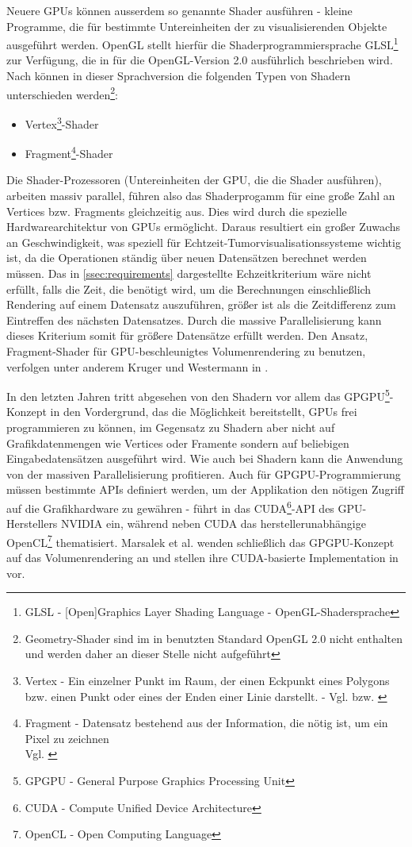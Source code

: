 \documentclass[pdftex,a4paper,titlepage,12pt]{scrartcl}
\newtheorem[L]{boxedDefinition}{Definition}
\begin{document}
\marginpar[Shader]{}\label{m:shader}Neuere GPUs können ausserdem so genannte Shader ausführen - kleine Programme, die für bestimmte Untereinheiten der zu visualisierenden Objekte ausgeführt werden. OpenGL stellt hierfür die Shaderprogrammiersprache GLSL\footnote{GLSL - [Open]Graphics Layer Shading Language - OpenGL-Shadersprache} zur Verfügung, die in \cite{Rost2006} für die OpenGL-Version 2.0 ausführlich beschrieben wird. Nach \cite[Seite 38-47]{Rost2006} können in dieser Sprachversion die folgenden Typen von Shadern unterschieden werden\footnote{Geometry-Shader sind im in \cite{Rost2006} benutzten Standard OpenGL 2.0 nicht enthalten und werden daher an dieser Stelle nicht aufgeführt}:
\begin{itemize}
 \item Vertex\footnote{Vertex - Ein einzelner Punkt im Raum, der einen Eckpunkt eines Polygons bzw. einen Punkt oder eines der Enden einer Linie darstellt. - Vgl. \cite[Seite 664]{Wright2000} bzw. \cite[Seite 685]{Rost2006}}-Shader
 \item Fragment\footnote{Fragment - Datensatz bestehend aus der Information, die nötig ist, um ein Pixel zu zeichnen\\Vgl. \cite[Seite 675]{Rost2006}}-Shader
\end{itemize}
Die Shader-Prozessoren (Untereinheiten der GPU, die die Shader ausführen), arbeiten massiv parallel, führen also das Shaderprogamm für eine große Zahl an Vertices bzw. Fragments gleichzeitig aus. Dies wird durch die spezielle Hardwarearchitektur von GPUs ermöglicht. Daraus resultiert ein großer Zuwachs an Geschwindigkeit, was speziell für Echtzeit-Tumorvisualisationssysteme wichtig ist, da die Operationen ständig über neuen Datensätzen berechnet werden müssen. Das in \vref{ssec:requirements} dargestellte Echzeitkriterium wäre nicht erfüllt, falls die Zeit, die benötigt wird, um die Berechnungen einschließlich Rendering auf einem Datensatz auszuführen, größer ist als die Zeitdifferenz zum Eintreffen des nächsten Datensatzes. Durch die massive Parallelisierung kann dieses Kriterium somit für größere Datensätze erfüllt werden.
Den Ansatz, Fragment-Shader für GPU-beschleunigtes Volumenrendering zu benutzen, verfolgen unter anderem Kruger und Westermann in \cite{Kruger2003}.

\marginpar[GPGPU]{}\label{m:gpgpu}In den letzten Jahren tritt abgesehen von den Shadern vor allem das GPGPU\footnote{GPGPU - General Purpose Graphics Processing Unit}-Konzept in den Vordergrund, das die Möglichkeit bereitstellt, GPUs frei programmieren zu können, im Gegensatz zu Shadern aber nicht auf Grafikdatenmengen wie Vertices oder Framente sondern auf beliebigen Eingabedatensätzen ausgeführt wird. Wie auch bei Shadern kann die Anwendung von der massiven Parallelisierung profitieren. Auch für GPGPU-Programmierung müssen bestimmte APIs definiert werden, um der Applikation den nötigen Zugriff auf die Grafikhardware zu gewähren - \cite{Sanders2010} führt in das CUDA\footnote{CUDA - Compute Unified Device Architecture}-API des GPU-Herstellers NVIDIA ein, während \cite{Kirk2010} neben CUDA das herstellerunabhängige OpenCL\footnote{OpenCL - Open Computing Language} thematisiert. Marsalek et al. wenden schließlich das GPGPU-Konzept auf das Volumenrendering an und stellen ihre CUDA-basierte Implementation in \cite{Marsalek2008} vor.
\end{document}
